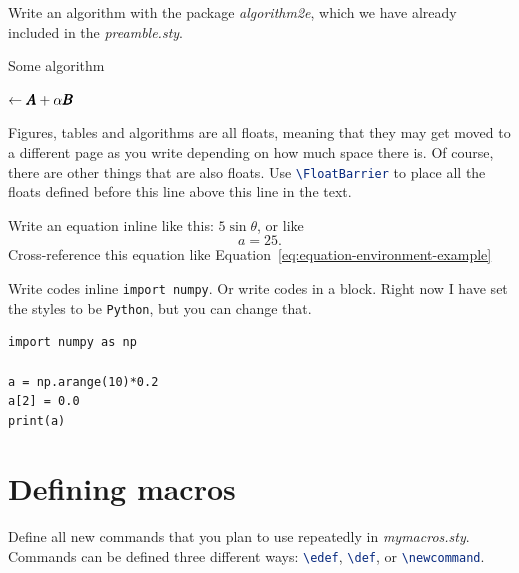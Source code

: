Write an algorithm with the package \emph{algorithm2e}, which we have already included in the \emph{preamble.sty}.


\begin{algorithm}
\caption{Some algorithm}\label{algo:example}


\out $\gets \pmb{A} +\alpha \pmb{B}$ 

\KwRet\out

\end{algorithm}

\FloatBarrier%
Figures, tables and algorithms are all floats, meaning that they may get moved to a different page as you write depending on how much space there is. 
Of course, there are other things that are also floats.
Use \lstinline[language=tex]!\FloatBarrier! to place all the floats defined before this line above this line in the text. 

Write an equation inline like this: $5\sin{\theta}$, or like 
\begin{equation}
    a = 25.
    \label{eq:equation-environment-example}
\end{equation}
Cross-reference this equation like Equation~\eqref{eq:equation-environment-example}

Write codes inline \lstinline!import numpy!.
Or write codes in a block.
Right now I have set the styles to be \lstinline{Python}, but you can change that.
\begin{lstlisting}
import numpy as np

a = np.arange(10)*0.2
a[2] = 0.0
print(a)
\end{lstlisting}

\section{Defining macros}\label{sec:intro:macros}
Define all new commands that you plan to use repeatedly in \emph{mymacros.sty}. 
Commands can be defined three different ways: \lstinline[language=tex]!\edef!, \lstinline[language=tex]!\def!, or \lstinline[language=tex]!\newcommand!.

